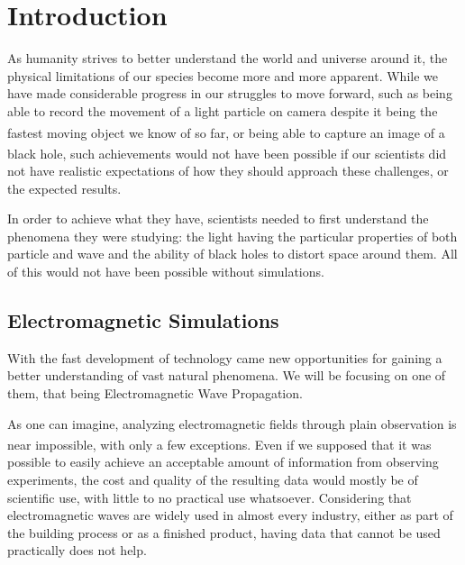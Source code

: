 
\chapter{Introduction} %

\label{Chapter1} %

As humanity strives to better understand the world and universe around it, the physical limitations of our species become more and more apparent. While we have made considerable progress in our struggles to move forward, such as being able to record the movement of a light particle on camera despite it being the fastest moving object we know of so far\textsuperscript{\cite{velten2013femto}}, or being able to capture an image of a black hole\textsuperscript{\cite{landau_2019}}, such achievements would not have been possible if our scientists did not have realistic expectations of how they should approach these challenges, or the expected results. 

In order to achieve what they have, scientists needed to first understand the phenomena they were studying: the light having the particular properties of both particle and wave and the ability of black holes to distort space around them. All of this would not have been possible without simulations. 


\section{Electromagnetic Simulations}
With the fast development of technology came new opportunities for gaining a better understanding of vast natural phenomena. We will be focusing on one of them, that being Electromagnetic Wave Propagation. 

As one can imagine, analyzing electromagnetic fields through plain observation is near impossible, with only a few exceptions\textsuperscript{\cite{cao2005first}}. Even if we supposed that it was possible to easily achieve an acceptable amount of information from observing experiments, the cost and quality of the resulting data would mostly be of scientific use, with little to no practical use whatsoever. Considering that electromagnetic waves are widely used in almost every industry, either as part of the building process or as a finished product, having data that cannot be used practically does not help. 

